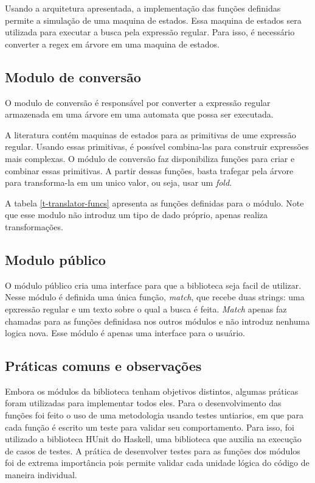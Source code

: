 Usando a arquitetura apresentada, a implementação das funções definidas permite a simulação de uma maquina de estados.
Essa maquina de estados sera utilizada para executar a busca pela expressão regular.
Para isso, é necessário converter a regex em árvore em uma maquina de estados.

\subsection{Modulo de conversão}

O modulo de conversão é responsável por converter a expressão regular armazenada em uma árvore em uma automata que possa ser executada.

A literatura contém maquinas de estados para as primitivas de ume expressão regular.
Usando essas primitivas, é possível combina-las para construir expressões mais complexas.
O módulo de conversão faz disponibiliza funções para criar e combinar essas primitivas.
A partir dessas funções, basta trafegar pela árvore para transforma-la em um unico valor, ou seja, usar um \emph{fold}.



A tabela \ref{t-translator-funcs} apresenta as funções definidas para o módulo.
Note que esse modulo não introduz um tipo de dado próprio, apenas realiza transformações.

\subsection{Modulo público}
O módulo público cria uma interface para que a biblioteca seja facil de utilizar.
Nesse módulo é definida uma única função, \emph{match}, que recebe duas strings: uma epxressão regular e um texto sobre o qual a busca é feita.
\emph{Match} apenas faz chamadas para as funções definidasa nos outros módulos e não introduz nenhuma logica nova.
Esse módulo é apenas uma interface para o usuário.

\subsection{Práticas comuns e observações}
Embora os módulos da biblioteca tenham objetivos distintos, algumas práticas foram utilizadas para implementar todos eles.
Para o desenvolvimento das funções foi feito o uso de uma metodologia usando testes untiarios, em que para cada função é escrito um teste para validar seu comportamento.
Para isso, foi utilizado a biblioteca HUnit do Haskell, uma biblioteca que auxilia na execução de casos de testes.
A prática de desenvolver testes para as funções dos módulos foi de extrema importância pois permite validar cada unidade lógica do código de maneira individual.

